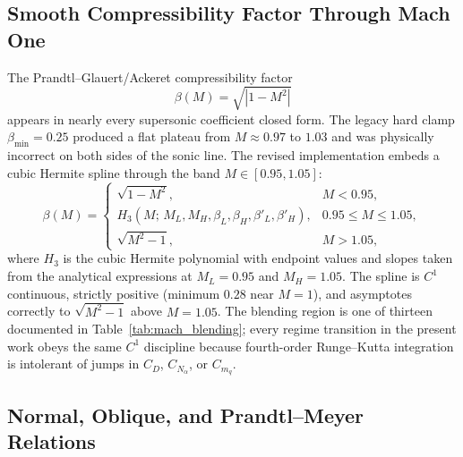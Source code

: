 \subsection{Smooth Compressibility Factor Through Mach One}
\label{subsec:beta}

The Prandtl--Glauert/Ackeret compressibility factor
%
\begin{equation}
\beta(M) = \sqrt{\left|1 - M^2\right|}
\label{eq:beta}
\end{equation}
%
appears in nearly every supersonic coefficient closed form. The legacy hard
clamp $\beta_{\min} = 0.25$ produced a flat plateau from $M \approx 0.97$ to
$1.03$ and was physically incorrect on both sides of the sonic line. The revised
implementation embeds a cubic Hermite spline through the band
$M \in [0.95, 1.05]$:
%
\begin{equation}
\beta(M) =
\begin{cases}
\sqrt{1 - M^2}, & M < 0.95,\\[2pt]
H_3\!\left(M;\,M_L, M_H, \beta_L, \beta_H, \beta'_L, \beta'_H\right),
  & 0.95 \leq M \leq 1.05,\\[2pt]
\sqrt{M^2 - 1}, & M > 1.05,
\end{cases}
\label{eq:beta_blend}
\end{equation}
%
where $H_3$ is the cubic Hermite polynomial with endpoint values and slopes
taken from the analytical expressions at $M_L = 0.95$ and $M_H = 1.05$. The
spline is $C^1$ continuous, strictly positive (minimum $0.28$ near $M = 1$), and
asymptotes correctly to $\sqrt{M^2 - 1}$ above $M = 1.05$. The blending region
is one of thirteen documented in Table~\ref{tab:mach_blending}; every regime
transition in the present work obeys the same $C^1$ discipline because
fourth-order Runge--Kutta integration is intolerant of jumps in $C_D$,
$C_{N_\alpha}$, or $C_{m_q}$.

\subsection{Normal, Oblique, and Prandtl--Meyer Relations}

